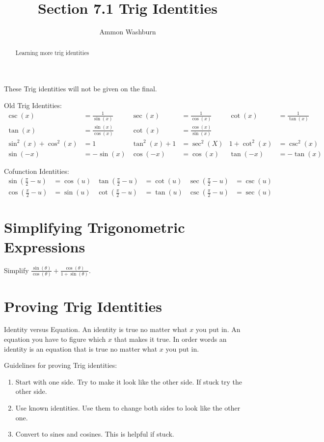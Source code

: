 \documentclass{tufte-handout}
\title{Section 7.1 Trig Identities}
\author[AW]{Ammon Washburn}
\begin{document}
\maketitle

\begin{abstract}
Learning more trig identities
\end{abstract}
These Trig identities will not be given on the final.

Old Trig Identities:
\begin{align*}
\csc(x) & = \frac{1}{\sin(x)} & \sec(x) & = \frac{1}{\cos(x)} & \cot(x) & = \frac{1}{\tan(x)} \\
\tan(x) & = \frac{\sin(x)}{\cos(x)} & \cot(x) & = \frac{\cos(x)}{\sin(x)} \\
\sin^2(x) + \cos^2(x) & = 1 & \tan^2(x) + 1 & = \sec^2(X) & 1 + \cot^2(x) & = \csc^2(x) \\
\sin(-x) & = -\sin(x) & \cos(-x) &= \cos(x) & \tan(-x) & = - \tan(x)
\end{align*}


Cofunction Identities:
\begin{align*}
\sin(\frac{\pi}{2}-u) & = \cos(u) & \tan(\frac{\pi}{2}-u) & = \cot(u) & \sec(\frac{\pi}{2}-u) & = \csc(u) \\
\cos(\frac{\pi}{2}-u) & = \sin(u) & \cot(\frac{\pi}{2}-u) & = \tan(u) & \csc(\frac{\pi}{2}-u) & = \sec(u) 
\end{align*}

\section{Simplifying Trigonometric Expressions}
Simplify $\frac{\sin(\theta)}{\cos(\theta)} + \frac{\cos(\theta)}{1+\sin(\theta)}$.

\section{Proving Trig Identities}
Identity versus Equation.  An identity is true no matter what $x$ you put in.  An equation you have to figure which $x$ that makes it true.  In order words an identity is an equation that is true no matter what $x$ you put in.

Guidelines for proving Trig identities:
\begin{enumerate}
\item Start with one side.  Try to make it look like the other side. If stuck try the other side.
\item Use known identities.  Use them to change both sides to look like the other one.
\item Convert to sines and cosines. This is helpful if stuck.
\end{enumerate}
\end{document}
